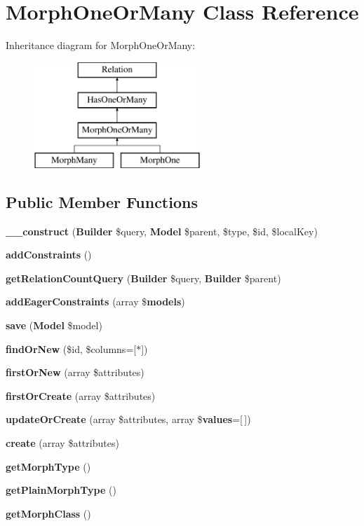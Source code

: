\section{Morph\+One\+Or\+Many Class Reference}
\label{class_illuminate_1_1_database_1_1_eloquent_1_1_relations_1_1_morph_one_or_many}
Inheritance diagram for Morph\+One\+Or\+Many\+:\begin{figure}[H]
\begin{center}
\leavevmode
\includegraphics[height=4.000000cm]{class_illuminate_1_1_database_1_1_eloquent_1_1_relations_1_1_morph_one_or_many}
\end{center}
\end{figure}
\subsection*{Public Member Functions}
\begin{DoxyCompactItemize}
\item 
{\bf \+\_\+\+\_\+construct} ({\bf Builder} \$query, {\bf Model} \$parent, \$type, \$id, \$local\+Key)
\item 
{\bf add\+Constraints} ()
\item 
{\bf get\+Relation\+Count\+Query} ({\bf Builder} \$query, {\bf Builder} \$parent)
\item 
{\bf add\+Eager\+Constraints} (array \${\bf models})
\item 
{\bf save} ({\bf Model} \$model)
\item 
{\bf find\+Or\+New} (\$id, \$columns=[\textquotesingle{}$\ast$\textquotesingle{}])
\item 
{\bf first\+Or\+New} (array \$attributes)
\item 
{\bf first\+Or\+Create} (array \$attributes)
\item 
{\bf update\+Or\+Create} (array \$attributes, array \${\bf values}=[$\,$])
\item 
{\bf create} (array \$attributes)
\item 
{\bf get\+Morph\+Type} ()
\item 
{\bf get\+Plain\+Morph\+Type} ()
\item 
{\bf get\+Morph\+Class} ()
\end{DoxyCompactItemize}
